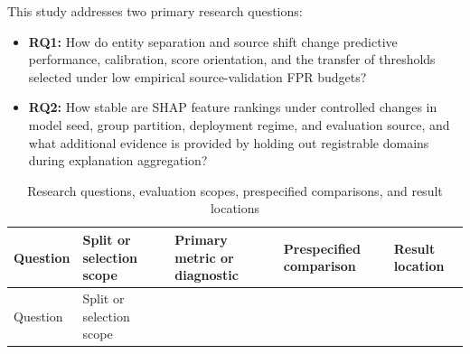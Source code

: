 \documentclass[
  10pt,
]{article}
\providecommand{\tightlist}{%
  \setlength{\itemsep}{0pt}\setlength{\parskip}{0pt}}
\begin{document}
This study addresses two primary research questions:

\begin{itemize}
\tightlist
\item
  \textbf{RQ1:} How do entity separation and source shift change
  predictive performance, calibration, score orientation, and the
  transfer of thresholds selected under low empirical source-validation
  FPR budgets?
\item
  \textbf{RQ2:} How stable are SHAP feature rankings under controlled
  changes in model seed, group partition, deployment regime, and
  evaluation source, and what additional evidence is provided by holding
  out registrable domains during explanation aggregation?
\end{itemize}

\begin{longtable}[]{@{}
  >{\raggedright\arraybackslash}p{}
  >{\raggedright\arraybackslash}p{}
  >{\raggedright\arraybackslash}p{}
  >{\raggedright\arraybackslash}p{}
  >{\raggedright\arraybackslash}p{}@{}}
\caption{Research questions, evaluation scopes, prespecified
comparisons, and result locations}\tabularnewline
\toprule\noalign{}
\begin{minipage}[b]{\linewidth}\raggedright
Question
\end{minipage} & \begin{minipage}[b]{\linewidth}\raggedright
Split or selection scope
\end{minipage} & \begin{minipage}[b]{\linewidth}\raggedright
Primary metric or diagnostic
\end{minipage} & \begin{minipage}[b]{\linewidth}\raggedright
Prespecified comparison
\end{minipage} & \begin{minipage}[b]{\linewidth}\raggedright
Result location
\end{minipage} \\
\midrule\noalign{}
\endfirsthead
\toprule\noalign{}
\begin{minipage}[b]{\linewidth}\raggedright
Question
\end{minipage} & \begin{minipage}[b]{\linewidth}\raggedright
Split or selection scope
\end{minipage} & \begin{minipage}[b]{\linewidth}\raggedright

\end{minipage}
\end{longtable}
\end{document}
